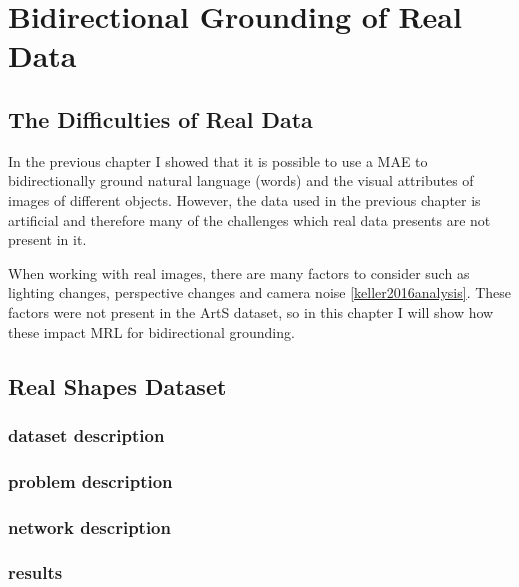 
\chapter{Bidirectional Grounding of Real Data} %

\label{Chapter6} %


\section{The Difficulties of Real Data}
In the previous chapter I showed that it is possible to use a MAE to bidirectionally ground natural language (words) and the visual attributes of images of different objects. However, the data used in the previous chapter is artificial and therefore many of the challenges which real data presents are not present in it. 

When working with real images, there are many factors to consider such as lighting changes, perspective changes and camera noise \ref{keller2016analysis}. These factors were not present in the ArtS dataset, so in this chapter I will show how these impact MRL for bidirectional grounding.


\section{Real Shapes Dataset}
\subsection{dataset description}
\subsection{problem description}
\subsection{network description}
\subsection{results}


